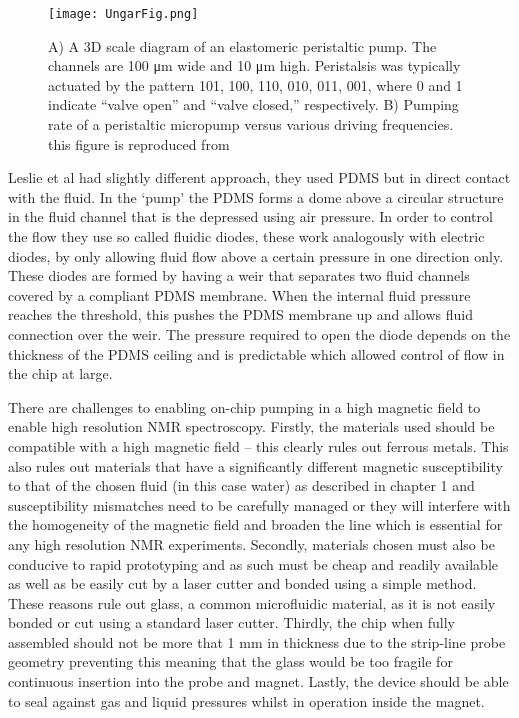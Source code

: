 \begin{figure}
  \begin{center}
  \texttt{[image: UngarFig.png]}
  \end{center}
  \caption{A) A 3D scale diagram of an elastomeric peristaltic pump. The channels are 100 μm wide and 10 μm high. Peristalsis was typically actuated by the pattern 101, 100, 110, 010, 011, 001, where 0 and 1 indicate “valve open” and “valve closed,” respectively. B) Pumping rate of a peristaltic micropump versus various driving frequencies. this
  figure is reproduced from\citep{RN59}}
  \label{fig:Ungar}
\end{figure}

Leslie et al\citep{RN100} had slightly different
approach, they used PDMS but in direct contact with the fluid. In the ‘pump’ the PDMS forms
a dome above a circular structure in the fluid channel that is the depressed using air
pressure. In order to control the flow they use so called fluidic diodes, these work
analogously with electric diodes, by only allowing fluid flow above a certain pressure in
one direction only. These diodes are formed by having a weir that separates two fluid
channels covered by a compliant PDMS membrane. When the internal fluid pressure reaches the
threshold, this pushes the PDMS membrane up and allows fluid connection over the weir. The
pressure required to open the diode depends on the thickness of the PDMS ceiling and is
predictable which allowed control of flow in the chip at large.

There are challenges to enabling on-chip pumping in a high magnetic field to enable high
resolution NMR spectroscopy. Firstly, the materials used should be compatible with a high
magnetic field – this clearly rules out ferrous metals. This also rules out materials that
have a significantly different magnetic susceptibility to that of the chosen fluid (in this
case water) as described in chapter 1 and susceptibility mismatches need to be carefully
managed or they will interfere with the homogeneity of the magnetic field and broaden the line which is
essential for any high resolution NMR experiments. Secondly, materials chosen must also be
conducive to rapid prototyping and as such must be cheap and readily available as well as
be easily cut by a laser cutter and bonded using a simple method. These reasons rule out
glass, a common microfluidic material, as it is not easily bonded or cut using a standard
laser cutter. Thirdly, the chip when fully assembled should not be more
that 1 mm in thickness due to the strip-line probe geometry preventing this meaning that
the glass would be too fragile for continuous insertion into the probe and magnet. Lastly,
the device should be able to seal against gas and liquid pressures whilst in operation
inside the magnet.

